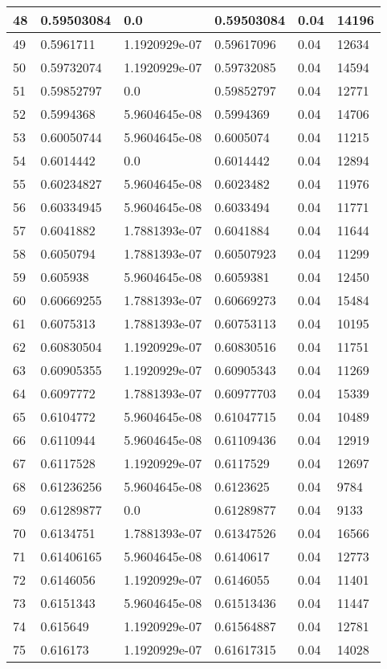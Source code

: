 \begin{longtable}{|l|l|l|l|l|l|}
48 & 0.59503084 & 0.0 & 0.59503084 & 0.04 & 14196 \\ \hline 
49 & 0.5961711 & 1.1920929e-07 & 0.59617096 & 0.04 & 12634 \\ \hline 
50 & 0.59732074 & 1.1920929e-07 & 0.59732085 & 0.04 & 14594 \\ \hline 
51 & 0.59852797 & 0.0 & 0.59852797 & 0.04 & 12771 \\ \hline 
52 & 0.5994368 & 5.9604645e-08 & 0.5994369 & 0.04 & 14706 \\ \hline 
53 & 0.60050744 & 5.9604645e-08 & 0.6005074 & 0.04 & 11215 \\ \hline 
54 & 0.6014442 & 0.0 & 0.6014442 & 0.04 & 12894 \\ \hline 
55 & 0.60234827 & 5.9604645e-08 & 0.6023482 & 0.04 & 11976 \\ \hline 
56 & 0.60334945 & 5.9604645e-08 & 0.6033494 & 0.04 & 11771 \\ \hline 
57 & 0.6041882 & 1.7881393e-07 & 0.6041884 & 0.04 & 11644 \\ \hline 
58 & 0.6050794 & 1.7881393e-07 & 0.60507923 & 0.04 & 11299 \\ \hline 
59 & 0.605938 & 5.9604645e-08 & 0.6059381 & 0.04 & 12450 \\ \hline 
60 & 0.60669255 & 1.7881393e-07 & 0.60669273 & 0.04 & 15484 \\ \hline 
61 & 0.6075313 & 1.7881393e-07 & 0.60753113 & 0.04 & 10195 \\ \hline 
62 & 0.60830504 & 1.1920929e-07 & 0.60830516 & 0.04 & 11751 \\ \hline 
63 & 0.60905355 & 1.1920929e-07 & 0.60905343 & 0.04 & 11269 \\ \hline 
64 & 0.6097772 & 1.7881393e-07 & 0.60977703 & 0.04 & 15339 \\ \hline 
65 & 0.6104772 & 5.9604645e-08 & 0.61047715 & 0.04 & 10489 \\ \hline 
66 & 0.6110944 & 5.9604645e-08 & 0.61109436 & 0.04 & 12919 \\ \hline 
67 & 0.6117528 & 1.1920929e-07 & 0.6117529 & 0.04 & 12697 \\ \hline 
68 & 0.61236256 & 5.9604645e-08 & 0.6123625 & 0.04 & 9784 \\ \hline 
69 & 0.61289877 & 0.0 & 0.61289877 & 0.04 & 9133 \\ \hline 
70 & 0.6134751 & 1.7881393e-07 & 0.61347526 & 0.04 & 16566 \\ \hline 
71 & 0.61406165 & 5.9604645e-08 & 0.6140617 & 0.04 & 12773 \\ \hline 
72 & 0.6146056 & 1.1920929e-07 & 0.6146055 & 0.04 & 11401 \\ \hline 
73 & 0.6151343 & 5.9604645e-08 & 0.61513436 & 0.04 & 11447 \\ \hline 
74 & 0.615649 & 1.1920929e-07 & 0.61564887 & 0.04 & 12781 \\ \hline 
75 & 0.616173 & 1.1920929e-07 & 0.61617315 & 0.04 & 14028 \\ \hline 
\end{longtable}